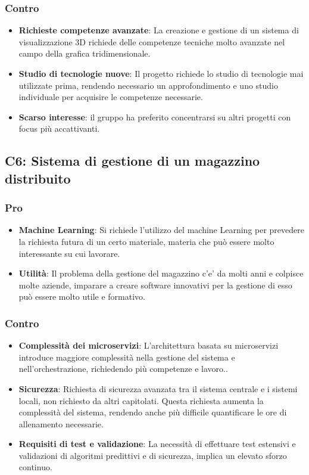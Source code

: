 \subsubsection{Contro}

\begin{itemize}
    \item \textbf{Richieste competenze avanzate}: La creazione e gestione di un sistema di visualizzazione 3D richiede delle competenze tecniche molto avanzate nel campo della grafica tridimensionale.
    \item \textbf{Studio di tecnologie nuove}: Il progetto richiede lo studio di tecnologie mai utilizzate prima, rendendo necessario un approfondimento e uno studio individuale per acquisire le competenze necessarie.
    \item \textbf{Scarso interesse}: il gruppo ha preferito concentrarsi su altri progetti con focus più accattivanti.
\end{itemize}


\subsection{C6: Sistema di gestione di un magazzino distribuito}

\subsubsection{Pro}

\begin{itemize}
    \item \textbf{Machine Learning}: Si richiede l'utilizzo del machine Learning per prevedere la richiesta futura di un certo materiale, materia che può essere molto interessante su cui lavorare.
    \item \textbf{Utilità}: Il problema della gestione del magazzino c’e’ da molti anni e colpisce molte aziende, imparare a creare software innovativi per la gestione di esso può essere molto utile e formativo.
\end{itemize}

\subsubsection{Contro}

\begin{itemize}
    \item \textbf{Complessità dei microservizi}: L'architettura basata su microservizi introduce maggiore complessità nella gestione del sistema e nell'orchestrazione, richiedendo più competenze e lavoro..
    \item \textbf{Sicurezza}: Richiesta di sicurezza avanzata tra il sistema centrale e i sistemi locali, non richiesto da altri capitolati. Questa richiesta aumenta la complessità del sistema, rendendo anche più difficile quantificare le ore di allenamento necessarie.
    \item \textbf{Requisiti di test e validazione}: La necessità di effettuare test estensivi e validazioni di algoritmi predittivi e di sicurezza, implica un elevato sforzo continuo.
\end{itemize}


